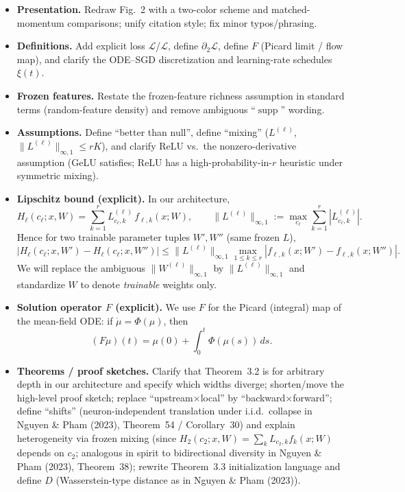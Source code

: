 \documentclass[11pt,a4paper]{article}
\newcommand{\NP}{Nguyen \& Pham (2023)}
\begin{document}
\begin{itemize}
  \item \textbf{Presentation.} Redraw Fig.~2 with a two-color scheme and matched-momentum comparisons; unify citation style; fix minor typos/phrasing.
  \item \textbf{Definitions.} Add explicit loss $\mathscr{L}$/$\mathcal{L}$, define $\partial_2\mathcal{L}$, define $F$ (Picard limit / flow map), and clarify the ODE--SGD discretization and learning-rate schedules $\xi(t)$.
  \item \textbf{Frozen features.} Restate the frozen-feature richness assumption in standard terms (random-feature density) and remove ambiguous ``$\operatorname{supp}$'' wording.
  \item \textbf{Assumptions.} Define ``better than null'', define ``mixing'' ($L^{(\ell)}$, $\|L^{(\ell)}\|_{\infty,1}\le rK$), and clarify ReLU vs.\ the nonzero-derivative assumption (GeLU satisfies; ReLU has a high-probability-in-$r$ heuristic under symmetric mixing).
  \item \textbf{Lipschitz bound (explicit).} In our architecture,
  \[
  H_\ell(c_\ell;x,W)=\sum_{k=1}^r L^{(\ell)}_{c_\ell,k}\,f_{\ell,k}(x;W),
  \qquad
  \|L^{(\ell)}\|_{\infty,1}:=\max_{c_\ell}\sum_{k=1}^r|L^{(\ell)}_{c_\ell,k}|.
  \]
  Hence for two trainable parameter tuples $W',W''$ (same frozen $L$),
  \[
  |H_\ell(c_\ell;x,W')-H_\ell(c_\ell;x,W'')|
  \le \|L^{(\ell)}\|_{\infty,1}\max_{1\le k\le r}|f_{\ell,k}(x;W')-f_{\ell,k}(x;W'')|.
  \]
  We will replace the ambiguous $\|W^{(\ell)}\|_{\infty,1}$ by $\|L^{(\ell)}\|_{\infty,1}$ and standardize $W$ to denote \emph{trainable} weights only.
  \item \textbf{Solution operator $F$ (explicit).} We use $F$ for the Picard (integral) map of the mean-field ODE: if $\dot\mu=\Phi(\mu)$, then
  \[
  (F\mu)(t)=\mu(0)+\int_0^t\Phi(\mu(s))\,ds.
  \]
  \item \textbf{Theorems / proof sketches.} Clarify that Theorem~3.2 is for arbitrary depth in our architecture and specify which widths diverge; shorten/move the high-level proof sketch; replace ``upstream$\times$local'' by ``backward$\times$forward''; define ``shifts'' (neuron-independent translation under i.i.d.\ collapse in \NP{}, Theorem~54 / Corollary~30) and explain heterogeneity via frozen mixing (since $H_2(c_2;x,W)=\sum_k L_{c_2,k}f_k(x;W)$ depends on $c_2$; analogous in spirit to bidirectional diversity in \NP{}, Theorem~38); rewrite Theorem~3.3 initialization language and define $D$ (Wasserstein-type distance as in \NP{}).
\end{itemize}
\end{document}
